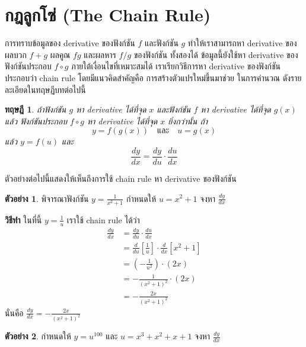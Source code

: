 \documentclass[
]{book}
\newtheorem{theorem}{ทฤษฎี}[chapter]
\theoremstyle{definition}
\theoremstyle{definition}
\newtheorem{example}{ตัวอย่าง}[chapter]
\theoremstyle{definition}
\theoremstyle{definition}
\theoremstyle{remark}
\begin{document}
\section{กฎลูกโซ่ (The Chain Rule)}\label{uxe01uxe0euxe25uxe01uxe42uxe0b-the-chain-rule}

การทราบข้อมูลของ derivative ของฟังก์ชัน \(f\) และฟังก์ชัน \(g\) ทำให้เราสามารถหา
derivative ของผลบวก \(f+g\) ผลคูณ \(fg\) และผลหาร \(f/g\) ของฟังก์ชัน ทั้งสองได้
ข้อมูลนี้ยังใช้หา derivative ของฟังก์ชันประกอบ \(f\circ g\) ภายใต้เงื่อนไขที่เหมาะสมได้
เราเรียกวิธีการหา derivative ของฟังก์ชัน ประกอบว่า chain rule โดยมีแนวคิดสำคัญคือ
การสร้างตัวแปรใหม่ขึ้นมาช่วย ในการคำนวณ ดังรายละเอียดในทฤษฏีบทต่อไปนี้

\begin{theorem}
ถ้าฟังก์ชัน \(g\) หา derivative ได้ที่จุด \(x\) และฟังก์ชัน \(f\) หา derivative ได้ที่จุด
\(g(x)\) แล้ว ฟังก์ชันประกอบ \(f \circ g\) หา derivative ได้ที่จุด \(x\) ยิ่งกว่านั้น ถ้า
\[y = f(g(x)) \quad \text{และ} \quad u = g(x)\] แล้ว \(y=f(u)\) และ
\[\label{E:chain1}
\boxed{
    \frac{dy}{dx} = \frac{dy}{du} \cdot \frac{du}{dx}
}\]
\end{theorem}

ตัวอย่างต่อไปนี้แสดงให้เห็นถึงการใช้ chain rule หา derivative ของฟังก์ชัน

\begin{example}
พิจารณาฟังก์ชัน \(y = \frac{1}{x^2+1}\) กำหนดให้ \(u = x^2+1\) จงหา
\(\frac{dy}{dx}\)
\end{example}

\textbf{วิธีทำ} ในที่นี้ \(y = \frac{1}{u}\) เราใช้ chain rule ได้ว่า
\begin{equation}   \begin{aligned}
    \frac{dy}{dx}
    &= \frac{dy}{du} \cdot \frac{du}{dx} \\
    &= \frac{d}{du}\left[\frac{1}{u}\right] \cdot \frac{d}{dx}[x^2+1] \\
    &= \left(-\frac{1}{u^2}\right) \cdot (2x) \\
    &= -\frac{1}{(x^2+1)^2} \cdot (2x) \\
    &= -\frac{2x}{(x^2+1)^2}
  \end{aligned} \end{equation} นั่นคือ
\(\displaystyle \frac{dy}{dx} = -\frac{2x}{(x^2+1)^2}\)

\begin{example}
กำหนดให้ \(y = u^{100}\) และ \(u = x^3 + x^2 + x + 1\) จงหา \(\frac{dy}{dx}\)
\end{example}
\end{document}
